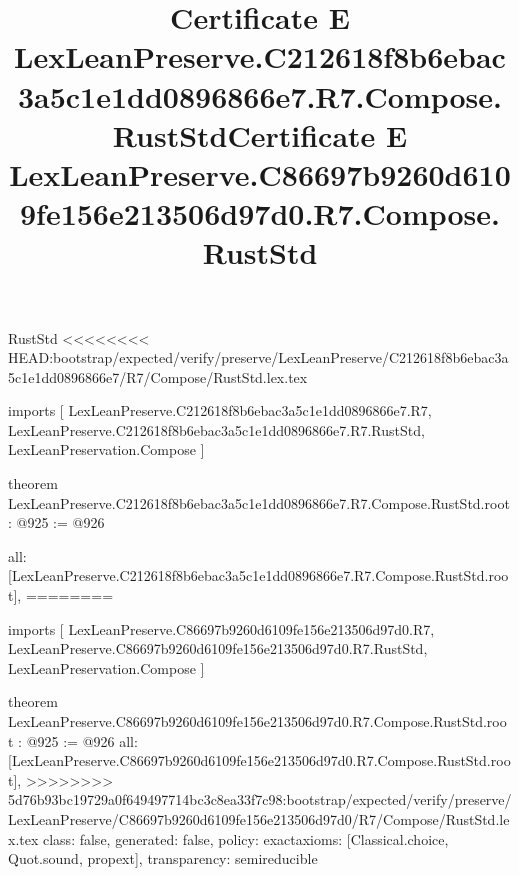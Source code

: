 \begin{lexlean}{RustStd}
<<<<<<<< HEAD:bootstrap/expected/verify/preserve/LexLeanPreserve/C212618f8b6ebac3a5c1e1dd0896866e7/R7/Compose/RustStd.lex.tex
\title{Certificate E LexLeanPreserve.C212618f8b6ebac3a5c1e1dd0896866e7.R7.Compose.RustStd}
\begin{coremodule}
imports [
  LexLeanPreserve.C212618f8b6ebac3a5c1e1dd0896866e7.R7,
  LexLeanPreserve.C212618f8b6ebac3a5c1e1dd0896866e7.R7.RustStd,
  LexLeanPreservation.Compose
]

theorem LexLeanPreserve.C212618f8b6ebac3a5c1e1dd0896866e7.R7.Compose.RustStd.root : @925 := @926 {
  all: [LexLeanPreserve.C212618f8b6ebac3a5c1e1dd0896866e7.R7.Compose.RustStd.root],
========
\title{Certificate E LexLeanPreserve.C86697b9260d6109fe156e213506d97d0.R7.Compose.RustStd}
\begin{coremodule}
imports [
  LexLeanPreserve.C86697b9260d6109fe156e213506d97d0.R7,
  LexLeanPreserve.C86697b9260d6109fe156e213506d97d0.R7.RustStd,
  LexLeanPreservation.Compose
]

theorem LexLeanPreserve.C86697b9260d6109fe156e213506d97d0.R7.Compose.RustStd.root : @925 := @926 {
  all: [LexLeanPreserve.C86697b9260d6109fe156e213506d97d0.R7.Compose.RustStd.root],
>>>>>>>> 5d76b93bc19729a0f649497714bc3c8ea33f7c98:bootstrap/expected/verify/preserve/LexLeanPreserve/C86697b9260d6109fe156e213506d97d0/R7/Compose/RustStd.lex.tex
  class: false,
  generated: false,
  policy: exact{axioms: [Classical.choice, Quot.sound, propext]},
  transparency: semireducible
}


\end{coremodule}}
\end{coremodule}
\end{lexlean}
